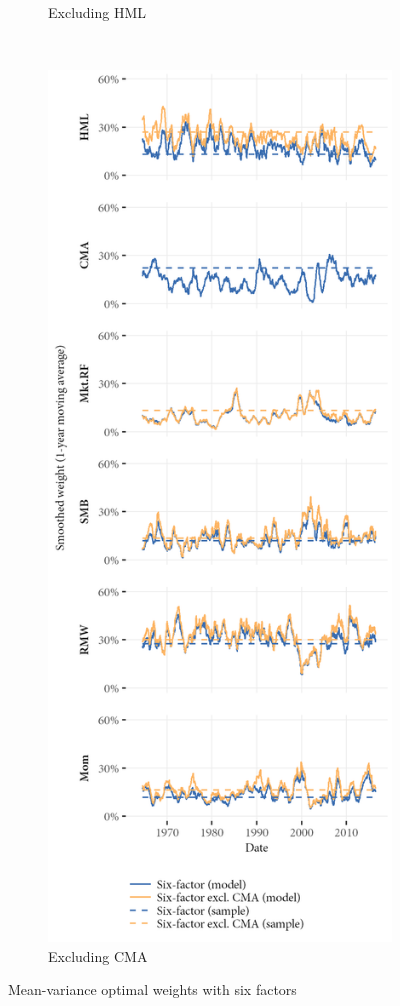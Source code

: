 \begin{figure}[p]
\begin{subfigure}{0.45\textwidth}
    \caption{Excluding HML}
  \end{subfigure}
  ~
  \begin{subfigure}{0.45\textwidth}
    \includegraphics[width=\textwidth]{graphics/weights/main_Weights_MV_6F_EXCL_CMA_6F.png}
    \caption{Excluding CMA}
  \end{subfigure}
  \caption{Mean-variance optimal weights with six factors}


\end{figure}
